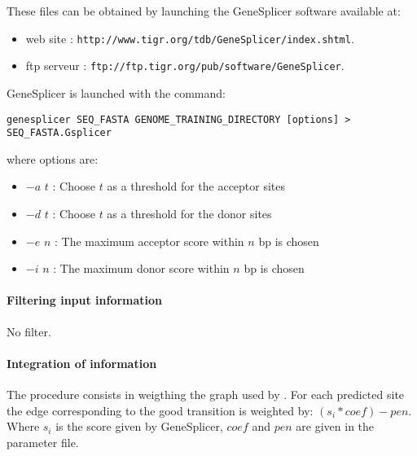These files can be obtained by launching the GeneSplicer software
available at:
\begin{itemize}
\item  web site : \texttt{http://www.tigr.org/tdb/GeneSplicer/index.shtml}.
\item  ftp serveur : \texttt{ftp://ftp.tigr.org/pub/software/GeneSplicer}.
\end{itemize}

GeneSplicer is launched with the command:
\begin{Verbatim}[fontsize=\small]
genesplicer SEQ_FASTA GENOME_TRAINING_DIRECTORY [options] > SEQ_FASTA.Gsplicer
\end{Verbatim}
where options are:
\begin{itemize}
\item $-a$ $t$ : Choose $t$ as a threshold for the acceptor sites
\item $-d$ $t$ : Choose $t$ as a threshold for the donor sites
\item $-e$ $n$ : The maximum acceptor score within $n$ bp is chosen
\item $-i$ $n$ : The maximum donor score within $n$ bp is chosen
\end{itemize}

\paragraph{Filtering input information}

No filter.

\paragraph{Integration of information}

The procedure consists in weigthing the graph used by \EuGene. For
each predicted site the edge corresponding to the good transition is
weighted by: $(s_i * coef) - pen$.  Where $s_i$ is the score given by
GeneSplicer, $coef$ and $pen$ are given in the parameter
file.

